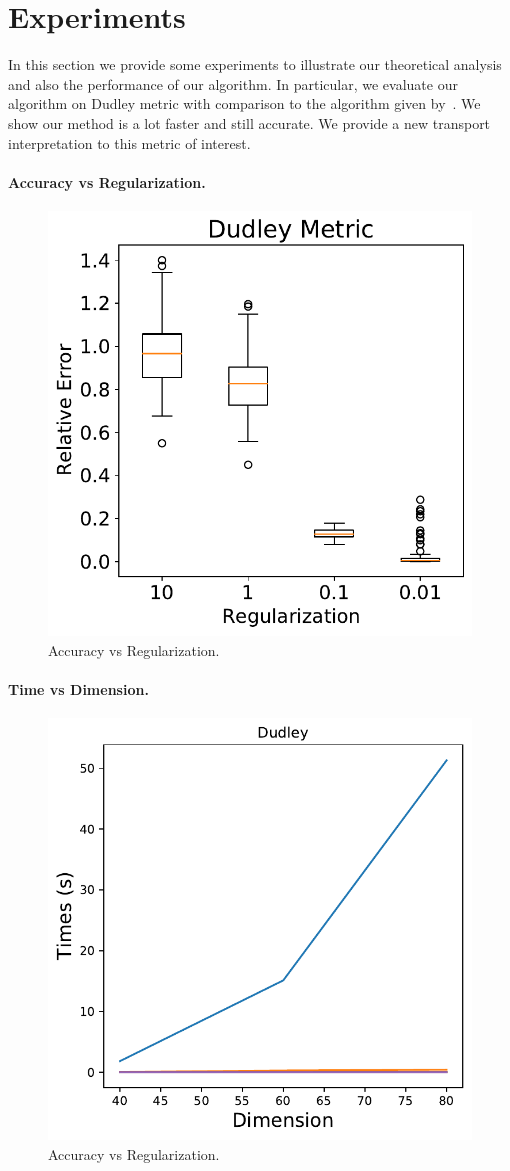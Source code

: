 \section{Experiments}
\label{sec:experiments}

In this section we provide some experiments to illustrate our theoretical analysis and also the performance of our algorithm. In particular, we evaluate our algorithm on Dudley metric with comparison to the algorithm given by~\cite{sriperumbudur2012empirical}. We show our method is a lot faster and still accurate. We provide a new transport interpretation to this metric of interest. 
\paragraph{Accuracy vs Regularization.} 

\begin{figure}[h!]
\centering
\includegraphics[width=0.8\linewidth]{figures/box_plot_accuracy.pdf}
\caption{Accuracy vs Regularization.\label{fig:result_acc}}
\end{figure}


\paragraph{Time vs Dimension.}

\begin{figure}[h!]
\centering
\includegraphics[width=0.3\linewidth]{figures/Time_vs_Dimension.pdf}
\caption{Accuracy vs Regularization.\label{fig:result_acc}}
\end{figure}


